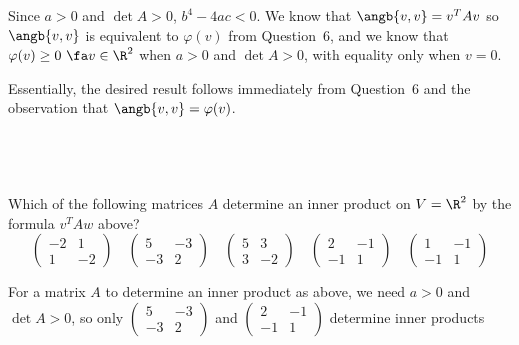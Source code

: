 \documentclass[a4paper]{article}
\begin{document}
Since $a > 0$ and $\det A > 0$, $b^4 - 4ac < 0$. We know that $\angb{v, v} = v^T A v$ so $\angb{v, v}$ is equivalent to $\varphi(v)$ from Question~6, and we know that $\varphi(v) \ge 0\ \fa v \in \R^2$ when $a > 0$ and $\det A > 0$, with equality only when $v=0$.

Essentially, the desired result follows immediately from Question~6 and the observation that $\angb{v, v} = \varphi(v)$.

\subsection{~} %

\begin{questionbody}
Which of the following matrices $A$ determine an inner product on $V = \R^2$ by the formula $v^T A w$ above?
$$
\begin{pmatrix}-2 & 1\\ 1 & -2\end{pmatrix}\hspace{1em}
\begin{pmatrix}5 & -3\\ -3 & 2\end{pmatrix}\hspace{1em}
\begin{pmatrix}5 & 3\\ 3 & -2\end{pmatrix}\hspace{1em}
\begin{pmatrix}2 & -1\\ -1 & 1\end{pmatrix}\hspace{1em}
\begin{pmatrix}1 & -1\\ -1 & 1\end{pmatrix}
$$
\end{questionbody}

For a matrix $A$ to determine an inner product as above, we need $a > 0$ and $\det A > 0$, so only $\begin{pmatrix}5 & -3\\ -3 & 2\end{pmatrix}$ and $\begin{pmatrix}2 & -1\\ -1 & 1\end{pmatrix}$ determine inner products

\end{document}
